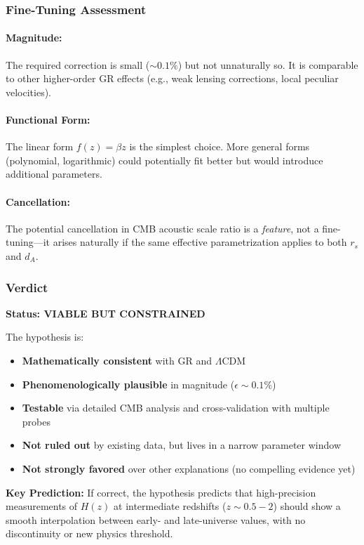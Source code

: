 \subsubsection{Fine-Tuning Assessment}

\paragraph{Magnitude:} The required correction is small ($\sim 0.1\%$) but not unnaturally so. It is comparable to other higher-order GR effects (e.g., weak lensing corrections, local peculiar velocities).

\paragraph{Functional Form:} The linear form $f(z) = \beta z$ is the simplest choice. More general forms (polynomial, logarithmic) could potentially fit better but would introduce additional parameters.

\paragraph{Cancellation:} The potential cancellation in CMB acoustic scale ratio is a \textit{feature}, not a fine-tuning—it arises naturally if the same effective parametrization applies to both $r_s$ and $d_A$.

\subsubsection{Verdict}

\textbf{Status: VIABLE BUT CONSTRAINED}

The hypothesis is:
\begin{itemize}
    \item \textbf{Mathematically consistent} with GR and $\Lambda$CDM
    \item \textbf{Phenomenologically plausible} in magnitude ($\epsilon \sim 0.1\%$)
    \item \textbf{Testable} via detailed CMB analysis and cross-validation with multiple probes
    \item \textbf{Not ruled out} by existing data, but lives in a narrow parameter window
    \item \textbf{Not strongly favored} over other explanations (no compelling evidence yet)
\end{itemize}

\textbf{Key Prediction:} If correct, the hypothesis predicts that high-precision measurements of $H(z)$ at intermediate redshifts ($z \sim 0.5-2$) should show a smooth interpolation between early- and late-universe values, with no discontinuity or new physics threshold.


